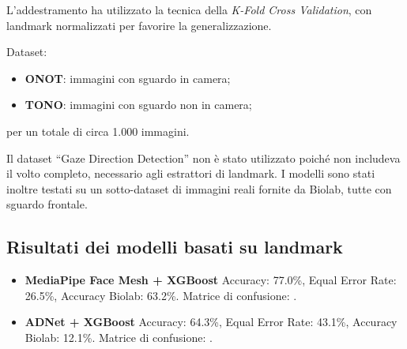 \documentclass[12pt,a4paper,openright,twoside]{book}
\begin{document}
L'addestramento ha utilizzato la tecnica della \textit{K-Fold Cross Validation}, con landmark normalizzati per favorire la generalizzazione.  

Dataset:
\begin{itemize}
    \item \textbf{ONOT}: immagini con sguardo in camera;
    \item \textbf{TONO}: immagini con sguardo non in camera;
\end{itemize}
per un totale di circa 1.000 immagini.  

Il dataset ``Gaze Direction Detection'' non è stato utilizzato poiché non includeva il volto completo, necessario agli estrattori di landmark. I modelli sono stati inoltre testati su un sotto-dataset di immagini reali fornite da Biolab, tutte con sguardo frontale.

\subsection{Risultati dei modelli basati su landmark}

\begin{itemize}
    \item \textbf{MediaPipe Face Mesh + XGBoost}  
    Accuracy: 77.0\%,  Equal Error Rate: 26.5\%,  Accuracy Biolab: 63.2\%.  
    Matrice di confusione: .
    
    \item \textbf{ADNet + XGBoost}  
    Accuracy: 64.3\%,  Equal Error Rate: 43.1\%,  Accuracy Biolab: 12.1\%.  
    Matrice di confusione: .
    
\end{itemize}
\end{document}
